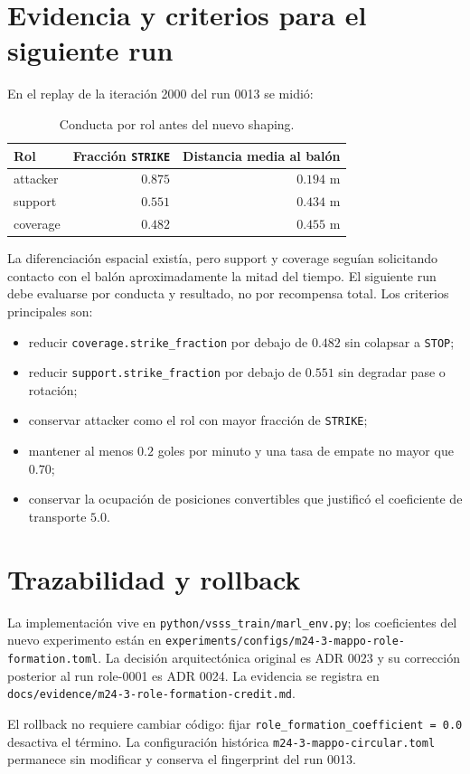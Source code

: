 \documentclass[11pt]{article}
\begin{document}
\section{Evidencia y criterios para el siguiente run}

En el replay de la iteración 2000 del run 0013 se midió:

\begin{table}[ht]
  \centering
  \caption{Conducta por rol antes del nuevo shaping.}
  \begin{tabular}{@{}lrr@{}}
    \toprule
    Rol & Fracción \texttt{STRIKE} & Distancia media al balón \\
    \midrule
    attacker & $0.875$ & $0.194$ m \\
    support  & $0.551$ & $0.434$ m \\
    coverage & $0.482$ & $0.455$ m \\
    \bottomrule
  \end{tabular}
\end{table}

La diferenciación espacial existía, pero support y coverage seguían solicitando contacto con el
balón aproximadamente la mitad del tiempo. El siguiente run debe evaluarse por conducta y
resultado, no por recompensa total. Los criterios principales son:

\begin{itemize}
  \item reducir \texttt{coverage.strike\_fraction} por debajo de $0.482$ sin colapsar a
    \texttt{STOP};
  \item reducir \texttt{support.strike\_fraction} por debajo de $0.551$ sin degradar pase o
    rotación;
  \item conservar attacker como el rol con mayor fracción de \texttt{STRIKE};
  \item mantener al menos $0.2$ goles por minuto y una tasa de empate no mayor que $0.70$;
  \item conservar la ocupación de posiciones convertibles que justificó el coeficiente de
    transporte $5.0$.
\end{itemize}

\section{Trazabilidad y rollback}

La implementación vive en \texttt{python/vsss\_train/marl\_env.py}; los coeficientes del nuevo
experimento están en \texttt{experiments/configs/m24-3-mappo-role-formation.toml}. La decisión
arquitectónica original es ADR 0023 y su corrección posterior al run role-0001 es ADR 0024. La
evidencia se registra en
\texttt{docs/evidence/m24-3-role-formation-credit.md}.

El rollback no requiere cambiar código: fijar
\texttt{role\_formation\_coefficient = 0.0} desactiva el término. La configuración histórica
\texttt{m24-3-mappo-circular.toml} permanece sin modificar y conserva el fingerprint del run
0013.
\end{document}
